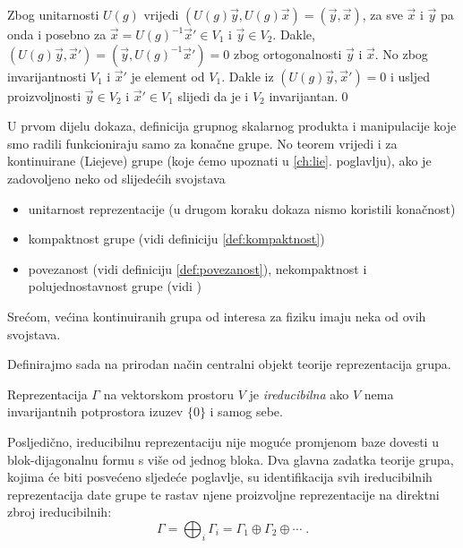 Zbog unitarnosti $U(g)$ vrijedi $(U(g) \vec{y} , U(g)\vec{x}) = 
(\vec{y}, \vec{x})$,
za sve $\vec{x}$ i $\vec{y}$ pa onda i posebno za 
$\vec{x}=U(g)^{-1}\vec{x}'\in V_1$ i
$\vec{y} \in V_2$. Dakle, $(U(g)\vec{y}, \vec{x}')=(\vec{y}, U(g)^{-1}\vec{x}')
=0$ zbog ortogonalnosti $\vec{y}$ i $\vec{x}$.
No zbog invarijantnosti $V_1$ i $\vec{x}'$ je element od $V_1$. Dakle iz
$(U(g) \vec{y} , \vec{x}') = 0$ i usljed proizvoljnosti $\vec{y}\in V_2$
i $\vec{x}'\in V_1$ slijedi da je i $V_2$ invarijantan.\qed


U prvom dijelu dokaza, definicija grupnog skalarnog produkta i manipulacije
koje smo radili funkcioniraju samo za konačne grupe. No teorem vrijedi i 
za kontinuirane (Liejeve) grupe (koje ćemo upoznati u \ref{ch:lie}. poglavlju),
ako je zadovoljeno neko od slijedećih svojstava
\begin{itemize}
\item unitarnost reprezentacije (u drugom koraku dokaza nismo koristili konačnost)
\item kompaktnost grupe (vidi definiciju \ref{def:kompaktnost}) 
\item povezanost (vidi definiciju \ref{def:povezanost}), nekompaktnost i polujednostavnost
    grupe (vidi \cite[79]{Cornwell:1997})  
\end{itemize}
Srećom, većina kontinuiranih grupa od interesa za fiziku imaju neka od ovih svojstava.

Definirajmo sada na prirodan način centralni objekt teorije reprezentacija grupa.
\begin{definicija}
Reprezentacija $\Gamma$ na vektorskom prostoru $V$ je
\emph{ireducibilna} ako $V$ nema invarijantnih potprostora
izuzev $\{0\}$ i samog sebe.
  
\label{def:irrep}
\end{definicija}
Posljedično, ireducibilnu reprezentaciju nije moguće promjenom baze 
dovesti u blok-dijagonalnu formu s više od jednog bloka.
Dva glavna zadatka teorije grupa, kojima će biti posvećeno sljedeće poglavlje,
su identifikacija svih ireducibilnih reprezentacija date grupe te rastav
njene proizvoljne reprezentacije na direktni zbroj ireducibilnih:
\begin{displaymath}
  \Gamma = \bigoplus_{i}  \Gamma_{i} = \Gamma_1 \oplus \Gamma_2 \oplus \cdots \;.
\end{displaymath}



